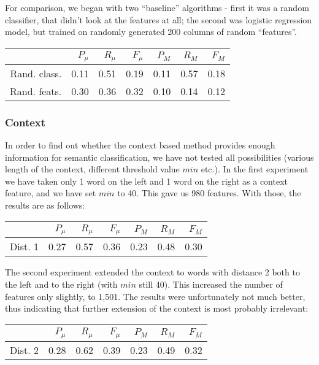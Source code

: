 \documentclass[letterpaper]{article}
\begin{document}
For comparison, we began with two ``baseline'' algorithms - first it was a random classifier, that didn't look at the features at all; the second was logistic regression model, but trained on randomly generated 200 columns of random ``features''.

\begin{table}[h]
\begin{tabular}{|r|r|r|r|r|r|r|}
 \hline
 & $P_\mu$ & $R_\mu$ & $F_\mu$ & $P_M$ & $R_M$  & $F_M$ \\ \hline
Rand. class. & 0.11 & 0.51 & 0.19 & 0.11 & 0.57 & 0.18 \\ \hline
Rand. feats. & 0.30 & 0.36 & 0.32 & 0.10 & 0.14 & 0.12 \\ \hline
\end{tabular}
\end{table}


\subsubsection{Context}
In order to find out whether the context based method provides enough information for semantic classification, we have not tested all possibilities (various length of the context, different threshold value $min$ etc.). In the first experiment we have taken only 1 word on the left and 1 word on the right as a context feature, and we have set $min$ to 40. This gave us 980 features. With those, the results are as follows:

\begin{table}[h]

\begin{tabular}{|r|r|r|r|r|r|r|}
 \hline
 & $P_\mu$ & $R_\mu$ & $F_\mu$ & $P_M$ & $R_M$  & $F_M$ \\ \hline
Dist. 1 & 0.27 & 0.57 & 0.36 & 0.23 & 0.48 & 0.30 \\ \hline
\end{tabular}
\end{table}

The second experiment extended the context to words with distance 2 both to the left and to the right 
(with $min$ still 40). This increased the number of features only slightly, to 1,501. The results were unfortunately not much better, thus indicating that further extension of the context is most probably irrelevant:

\begin{table}[h]
\begin{tabular}{|r|r|r|r|r|r|r|}
 \hline
 & $P_\mu$ & $R_\mu$ & $F_\mu$ & $P_M$ & $R_M$  & $F_M$ \\ \hline
Dist. 2 & 0.28 & 0.62 & 0.39 & 0.23 & 0.49 & 0.32 \\ \hline
\end{tabular}
\end{table}
\end{document}
